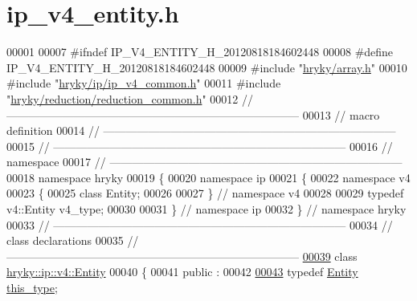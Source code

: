 \hypertarget{ip__v4__entity_8h_source}{\section{ip\-\_\-v4\-\_\-entity.\-h}
}

\begin{DoxyCode}
00001 
00007 \textcolor{preprocessor}{#ifndef IP\_V4\_ENTITY\_H\_20120818184602448}
00008 \textcolor{preprocessor}{}\textcolor{preprocessor}{#define IP\_V4\_ENTITY\_H\_20120818184602448}
00009 \textcolor{preprocessor}{}\textcolor{preprocessor}{#include "\hyperlink{array_8h}{hryky/array.h}"}
00010 \textcolor{preprocessor}{#include "\hyperlink{ip__v4__common_8h}{hryky/ip/ip_v4_common.h}"}
00011 \textcolor{preprocessor}{#include "\hyperlink{reduction__common_8h}{hryky/reduction/reduction_common.h}"}
00012 \textcolor{comment}{//
      ------------------------------------------------------------------------------}
00013 \textcolor{comment}{// macro definition}
00014 \textcolor{comment}{//
      ------------------------------------------------------------------------------}
00015 \textcolor{comment}{//
      ------------------------------------------------------------------------------}
00016 \textcolor{comment}{// namespace}
00017 \textcolor{comment}{//
      ------------------------------------------------------------------------------}
00018 \textcolor{keyword}{namespace }hryky
00019 \{
00020 \textcolor{keyword}{namespace }ip
00021 \{
00022 \textcolor{keyword}{namespace }v4
00023 \{
00025     \textcolor{keyword}{class }Entity;
00026 
00027 \} \textcolor{comment}{// namespace v4}
00028 
00029 \textcolor{keyword}{typedef} v4::Entity v4\_type;
00030 
00031 \} \textcolor{comment}{// namespace ip}
00032 \} \textcolor{comment}{// namespace hryky}
00033 \textcolor{comment}{//
      ------------------------------------------------------------------------------}
00034 \textcolor{comment}{// class declarations}
00035 \textcolor{comment}{//
      ------------------------------------------------------------------------------}
\hypertarget{ip__v4__entity_8h_source_l00039}{}\hyperlink{classhryky_1_1ip_1_1v4_1_1_entity}{00039} \textcolor{comment}{}\textcolor{keyword}{class }\hyperlink{classhryky_1_1ip_1_1v4_1_1_entity}{hryky::ip::v4::Entity}
00040 \{
00041 \textcolor{keyword}{public} :
00042 
\hypertarget{ip__v4__entity_8h_source_l00043}{}\hyperlink{classhryky_1_1ip_1_1v4_1_1_entity_a0ac5c55710070f7c540a5243bcfa8836}{00043}     \textcolor{keyword}{typedef} \hyperlink{classhryky_1_1ip_1_1v4_1_1_entity}{Entity}                                  \hyperlink{classhryky_1_1ip_1_1v4_1_1_entity_a0ac5c55710070f7c540a5243bcfa8836}{this_type};

\end{DoxyCode}
